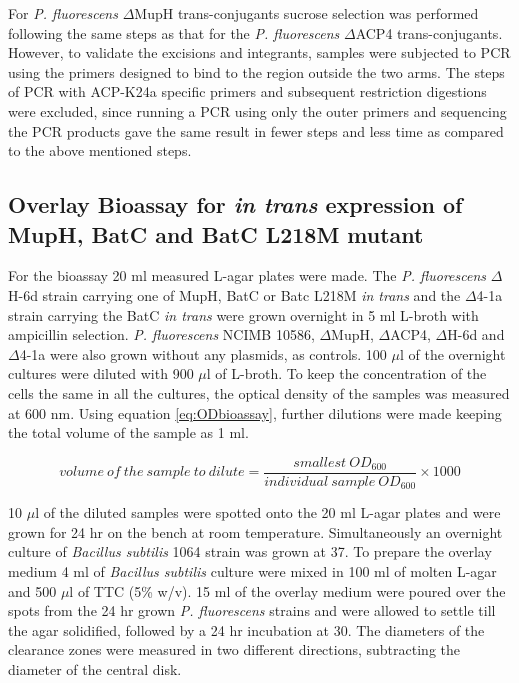 		For \textit{P. fluorescens} $ \Delta $MupH trans-conjugants sucrose selection was performed following the same steps as that for the \textit{P. fluorescens} $ \Delta $ACP4 trans-conjugants. However, to validate the excisions and integrants, samples were subjected to PCR using the primers designed to bind to the region outside the two arms. The steps of PCR with ACP-K24a specific primers and subsequent restriction digestions were excluded, since running a PCR using only the outer primers and sequencing the PCR products gave the same result in fewer steps and less time as compared to the above mentioned steps. 

		\subsection{Overlay Bioassay for \textit{in trans} expression of MupH, BatC and BatC L218M mutant}
		\label{sec:bioassay}
	
		For the bioassay 20 ml measured L-agar plates were made. The \textit{P. fluorescens} $ \Delta $H-6d strain carrying one of MupH, BatC or Batc L218M \textit{in trans} and the $ \Delta $4-1a  strain carrying the BatC \textit{in trans} were grown overnight in 5 ml L-broth with ampicillin selection. \textit{P. fluorescens} NCIMB 10586, $\Delta $MupH,  $ \Delta $ACP4, $ \Delta $H-6d and $ \Delta $4-1a were also grown without any plasmids, as controls. 100 $\mu$l of the overnight cultures were diluted with 900 $\mu$l of L-broth. To keep the concentration of the cells the same in all the cultures, the optical density of the samples was measured at 600 nm. Using equation \ref{eq:ODbioassay}, further dilutions were made keeping the total volume of the sample as 1 ml. 
		
		\begin{equation}
		\label{eq:ODbioassay}
		volume \ of \ the \ sample \ to \ dilute = \frac{smallest \ OD_{600}}{individual \ sample  \ OD_{600}} \times 1000
		\end{equation} 
		
		10 $ \mu $l of the diluted samples were spotted onto the 20 ml L-agar plates and were grown for 24 hr on the bench at room temperature. Simultaneously an overnight culture of \textit{Bacillus subtilis} 1064 strain was grown at 37\textcelsius. To prepare the overlay medium 4 ml of \textit{Bacillus subtilis} culture were mixed in 100 ml of molten L-agar and 500 $ \mu $l of TTC (5\% w/v). 15 ml of the overlay medium were poured over the spots from the 24 hr grown \textit{P. fluorescens} strains and were allowed to settle till the agar solidified, followed by a 24 hr incubation at 30\textcelsius. The diameters of the clearance zones were measured in two different directions, subtracting the diameter of the central disk. 
		  
